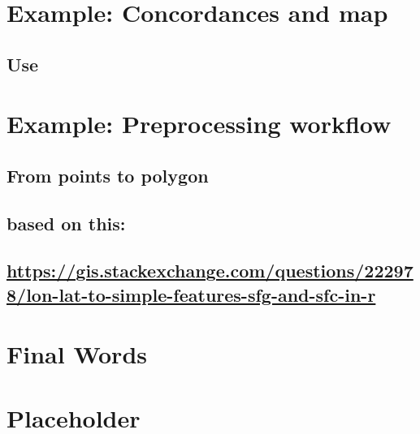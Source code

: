 \documentclass[]{book}
\theoremstyle{definition}
\theoremstyle{definition}
\theoremstyle{definition}
\theoremstyle{remark}
\begin{document}
\chapter{Example: Concordances and
map}\label{example-concordances-and-map}

\section{Use}\label{use}

\chapter{Example: Preprocessing
workflow}\label{example-preprocessing-workflow}

\section{From points to polygon}\label{from-points-to-polygon}

\section{based on this:}\label{based-on-this}

\section{\texorpdfstring{\url{https://gis.stackexchange.com/questions/222978/lon-lat-to-simple-features-sfg-and-sfc-in-r}}{https://gis.stackexchange.com/questions/222978/lon-lat-to-simple-features-sfg-and-sfc-in-r}}\label{httpsgis.stackexchange.comquestions222978lon-lat-to-simple-features-sfg-and-sfc-in-r}

\chapter{Final Words}\label{final-words}

\chapter{Placeholder}\label{placeholder}


\end{document}
